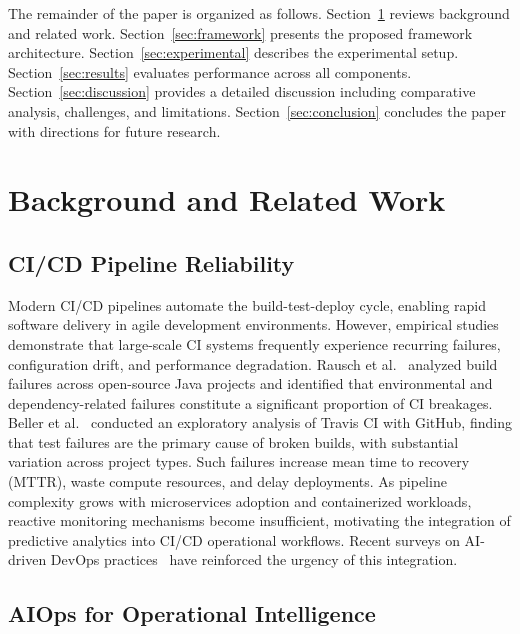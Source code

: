 \documentclass[sn-nature]{sn-jnl}
\theoremstyle{thmstyleone}
\theoremstyle{thmstyletwo}
\theoremstyle{thmstylethree}
\begin{document}
The remainder of the paper is organized as follows. Section~\ref{sec:related} reviews background and related work.
Section~\ref{sec:framework} presents the proposed framework architecture. Section~\ref{sec:experimental} describes the experimental setup. Section~\ref{sec:results} evaluates performance across all components.
Section~\ref{sec:discussion} provides a detailed discussion including comparative analysis, challenges, and limitations. Section~\ref{sec:conclusion} concludes the paper with directions for future research.

\section{Background and Related Work}\label{sec:related}

\subsection{CI/CD Pipeline Reliability}\label{subsec:cicd}

Modern CI/CD pipelines automate the build-test-deploy cycle, enabling rapid software delivery in agile development environments.
However, empirical studies demonstrate that large-scale CI systems frequently experience recurring failures, configuration drift, and performance degradation.
Rausch et al.~\cite{rausch2017empirical} analyzed build failures across open-source Java projects and identified that environmental and dependency-related failures constitute a significant proportion of CI breakages.
Beller et al.~\cite{beller2017oops} conducted an exploratory analysis of Travis CI with GitHub, finding that test failures are the primary cause of broken builds, with substantial variation across project types.
Such failures increase mean time to recovery (MTTR), waste compute resources, and delay deployments.
As pipeline complexity grows with microservices adoption and containerized workloads, reactive monitoring mechanisms become insufficient, motivating the integration of predictive analytics into CI/CD operational workflows.
Recent surveys on AI-driven DevOps practices~\cite{kanahols2025timeseries} have reinforced the urgency of this integration.

\subsection{AIOps for Operational Intelligence}\label{subsec:aiops}
\end{document}
